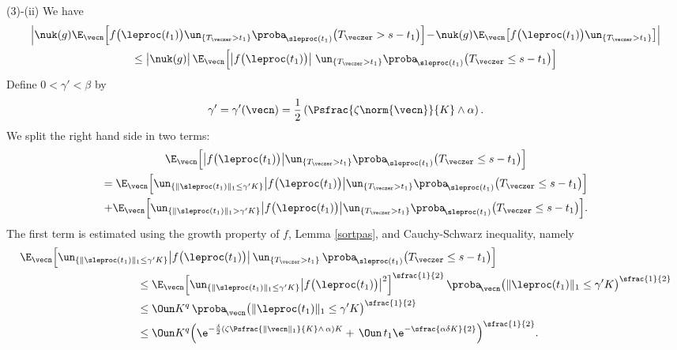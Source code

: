 (3)-(ii) We have
\begin{multline*}
\Bigl|\nuk(g) \E_{\vecn}\Bigl[
f\bigl(\leproc(t_{1})\bigr)\un_{\{T_{\veczer}>t_{1}\}}
\proba_{\!\sleproc(t_{1})}\bigl(T_{\veczer}>s-t_{1}\bigr)\Bigr]\!-\!\nuk(g) \E_{\vecn}\bigl[f\bigl(\leproc(t_{1})\bigr)\un_{\{T_{\veczer}>t_{1}\}}\bigr]\Bigr|\\
\le \big|\nuk(g)\big|\, \E_{\vecn}\Bigl[
\big|f\bigl(\leproc(t_{1})\bigr)\big|\;\un_{\{T_{\veczer}>t_{1}\}}
\proba_{\!\sleproc(t_{1})}\bigl(T_{\veczer}\le s-t_{1}\bigr)\Bigr]
\end{multline*}
Define $0<\gamma'<\beta$ by
\[
\gamma'=\gamma'(\vecn)=\frac{1}{2} \left(\Psfrac{\zeta \norm{\vecn}}{K} \wedge \alpha\right).
\]
We split the right hand side in two terms:
\begin{multline*}
\E_{\vecn}\Bigl[
\big|f\bigl(\leproc(t_{1})\bigr)\big|\un_{\{T_{\veczer}>t_{1}\}}
\proba_{\!\sleproc(t_{1})}\bigl(T_{\veczer}\le s-t_{1}\bigr)\Bigr]\\
=\E_{\vecn}\Bigl[\un_{\{\|\sleproc(t_{1})\|_1\le \gamma' K\}}
\big|f\bigl(\leproc(t_{1})\bigr)\big|\un_{\{T_{\veczer}>t_{1}\}}
\proba_{\!\sleproc(t_{1})}\bigl(T_{\veczer}\le s-t_{1}\bigr)\Bigr] \\
+\E_{\vecn}\Bigl[\un_{\{\|\sleproc(t_{1})\|_1> \gamma' K\}}
\big|f\bigl(\leproc(t_{1})\bigr)\big|\un_{\{T_{\veczer}>t_{1}\}}
\proba_{\!\sleproc(t_{1})}\bigl(T_{\veczer}\le s-t_{1}\bigr)\Bigr].
\end{multline*}
The first term is estimated using the growth property of $f$, Lemma \ref{sortpas},
and Cauchy-Schwarz inequality, namely
\begin{align*}
\E_{\vecn}\Bigl[\un_{\{\|\sleproc(t_{1})\|_1\le \gamma' K\}}&\big|f\bigl(\leproc(t_{1})\bigr)\big|\,
\un_{\{T_{\veczer}>t_{1}\}}\,\proba_{\!\sleproc(t_{1})}\bigl(T_{\veczer}\le s-t_{1}\bigr)\Bigr]\\
& \hspace*{-1cm}\le \E_{\vecn}\Bigl[\un_{\{\|\sleproc(t_{1})\|_1\le \gamma' K\}}
\big|f\bigl(\leproc(t_{1})\bigr)\big|^2\Bigr]^{\sfrac{1}{2}}\,\proba_{\!\vecn}\bigl(\|\leproc(t_{1})\|_1\le \gamma'K\bigr)^{\sfrac{1}{2}}\\
& \hspace*{-1cm}\le \Oun K^{q}\,\proba_{\!\vecn}\bigl(\|\leproc(t_{1})\|_1\le\gamma'K\bigr)^{\sfrac{1}{2}} \\
& \hspace*{-1cm}\le \Oun K^{q}\Bigl(\e^{-\frac{\delta}{2}\left(\zeta\Psfrac{\|\vecn\|_{1}}{K}\wedge\,\alpha\right)K}
+\,\Oun\, t_1 \e^{-\sfrac{\alpha\delta K}{2}} \Bigr)^{\sfrac{1}{2}}.
\end{align*}
